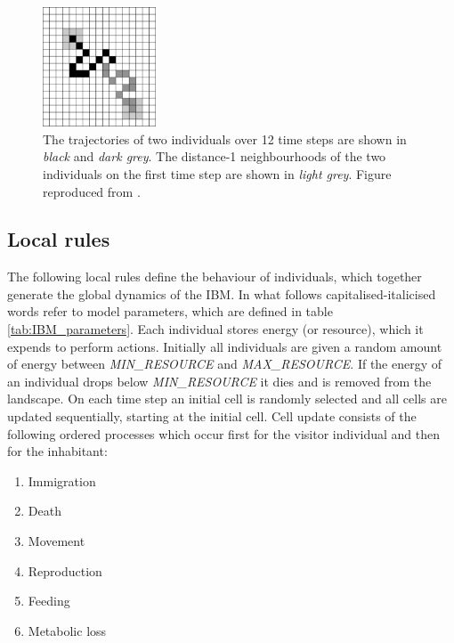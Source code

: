 

\begin{figure}
	\centering
	\includegraphics[width=0.3\textwidth]{"diagrams/IBM_movement"}
	\caption[Motion of individuals.]{The trajectories of two individuals over 12 time steps are shown in \emph{black} and \emph{dark grey}. The distance-1 neighbourhoods of the two individuals on the first time step are shown in \emph{light grey}. Figure reproduced from \cite{lurgi2015effects}.}
	\label{fig:IBM_motion}
\end{figure}


\subsection{Local rules}
\label{sec:CA_rules}

The following local rules define the behaviour of individuals, which together generate the global dynamics of the IBM. In what follows capitalised-italicised words refer to model parameters, which are defined in table \ref{tab:IBM_parameters}. Each individual stores energy (or resource), which it expends to perform actions. Initially all individuals are given a random amount of energy between \emph{MIN\_RESOURCE} and \emph{MAX\_RESOURCE}. If the energy of an individual drops below \emph{MIN\_RESOURCE} it dies and is removed from the landscape. On each time step an initial cell is randomly selected and all cells are updated sequentially, starting at the initial cell. Cell update consists of the following ordered processes which occur first for the visitor individual and then for the inhabitant:

\begin{enumerate}
	\item Immigration
	\item Death
	\item Movement
	\item Reproduction
	\item Feeding
	\item Metabolic loss
\end{enumerate}

